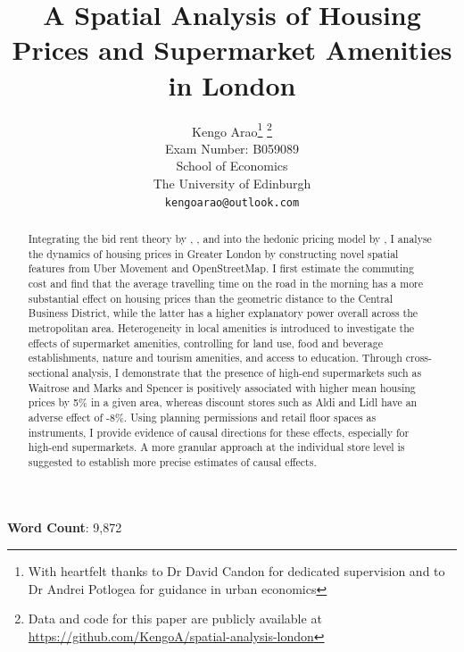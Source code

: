 \documentclass{article}
\title{A Spatial Analysis of Housing Prices and Supermarket Amenities in London}
\author{
  \large{Kengo Arao}\thanks{With heartfelt thanks to Dr David Candon for dedicated supervision and to Dr Andrei Potlogea for guidance in urban economics}      \thanks{Data and code for this paper are publicly available at \href{https://github.com/KengoA/spatial-analysis-london}{https://github.com/KengoA/spatial-analysis-london}} \\
  Exam Number: B059089 \\
  School of Economics\\
  The University of Edinburgh\\
  \texttt{kengoarao@outlook.com}
}
\begin{document}
\maketitle

\begin{abstract}
Integrating the bid rent theory by \citet{AlonsoWilliam1964Lalu}, \citet{MuthRichardF.1969Cah:}, and \citet{MillsEdwinSmith1972Sits} into the hedonic pricing model by \citet{Rosen1984}, I analyse the dynamics of housing prices in Greater London by constructing novel spatial features from Uber Movement and OpenStreetMap. I first estimate the commuting cost and find that the average travelling time on the road in the morning has a more substantial effect on housing prices than the geometric distance to the Central Business District, while the latter has a higher explanatory power overall across the metropolitan area. Heterogeneity in local amenities is introduced to investigate the effects of supermarket amenities, controlling for land use, food and beverage establishments, nature and tourism amenities, and access to education. Through cross-sectional analysis, I demonstrate that the presence of high-end supermarkets such as Waitrose and Marks and Spencer is positively associated with higher mean housing prices by 5\% in a given area, whereas discount stores such as Aldi and Lidl have an adverse effect of -8\%. Using planning permissions and retail floor spaces as instruments, I provide evidence of causal directions for these effects, especially for high-end supermarkets. A more granular approach at the individual store level is suggested to establish more precise estimates of causal effects.

\end{abstract}

\begin{center}
    \textbf{Word Count}: 9,872
\end{center}

\newpage
\tableofcontents

\newpage
\end{document}
